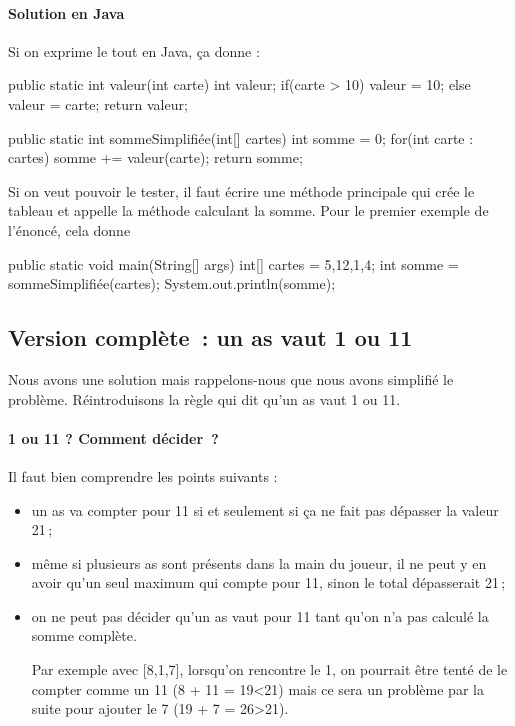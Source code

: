 \paragraph{Solution en Java}

Si on exprime le tout en Java, ça donne :

\begin{java}
public static int valeur(int carte) {
    int valeur;
    if(carte > 10) {
        valeur = 10;
    } else {
        valeur = carte;
    }
    return valeur;
}

public static int sommeSimplifiée(int[] cartes) {
    int somme = 0;
    for(int carte : cartes) {
        somme += valeur(carte);
    }
    return somme;
}
\end{java}

Si on veut pouvoir le tester, il faut écrire une méthode principale qui
crée le tableau et appelle la méthode calculant la somme. Pour le
premier exemple de l'énoncé, cela donne

\begin{java}
public static void main(String[] args) {
    int[] cartes = {5,12,1,4};
    int somme = sommeSimplifiée(cartes);
    System.out.println(somme);
}
\end{java}

\subsection{Version complète~: un as vaut 1 ou 11}

Nous avons une solution mais rappelons-nous que nous avons simplifié le
problème. Réintroduisons la règle qui dit qu'un as vaut 1 ou 11.

\paragraph{1 ou 11 ? Comment décider~?}

Il faut bien comprendre les points suivants : 

\begin{itemize}

	\item un as va compter pour 11 si et seulement si ça ne fait pas dépasser 
		la valeur 21\,;
		
	\item même si plusieurs as sont présents dans la main du joueur, il ne peut
		y en avoir qu'un seul maximum qui compte pour 11, sinon le total
		dépasserait 21\,;

	\item on ne peut pas décider qu'un as vaut pour 11 tant qu'on n'a pas
		calculé la somme complète. 
		
		Par exemple avec {[}8,1,7{]}, lorsqu'on rencontre le 1, on pourrait
		être tenté de le compter comme un 11 (8 + 11 = 19\textless{}21) mais ce
		sera un problème par la suite pour ajouter le 7 (19
		+ 7 = 26\textgreater{}21).

\end{itemize}

